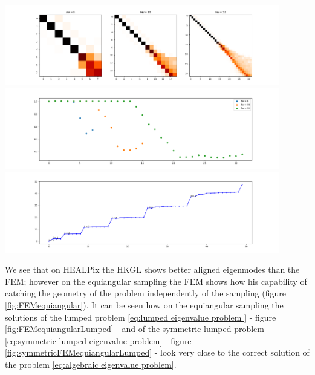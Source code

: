 \begin{minipage}[t!]{.49\textwidth}
	\raggedright
	\center
	\label{fig:symmetricFEMequiangularLumped}
	\centering
	\includegraphics[width=0.9\textwidth]{../codes/03.FEM_laplacian/equiangular/mass_lumping/BLB/img/linearFEM.png}
	\includegraphics[width=0.9\textwidth]{../codes/03.FEM_laplacian/equiangular/mass_lumping/BLB/img/linearFEM_diagonal.png}	
	\includegraphics[width=0.9\textwidth]{../codes/03.FEM_laplacian/equiangular/mass_lumping/BLB/img/FEM_eigenvalues_32.png}	
\end{minipage}

We see that on HEALPix the HKGL shows better aligned eigenmodes than the FEM; however on the equiangular sampling the FEM shows how his capability of catching the geometry of the problem independently of the sampling (figure \ref{fig:FEMequiangular}). It can be seen how on the equiangular sampling the solutions of the lumped problem \ref{eq:lumped eigenvalue problem } - figure \ref{fig:FEMequiangularLumped} - and of the symmetric lumped problem \ref{eq:symmetric lumped eigenvalue problem} - figure \ref{fig:symmetricFEMequiangularLumped} - look very close to the correct solution of the problem \ref{eq:algebraic  eigenvalue problem}.



